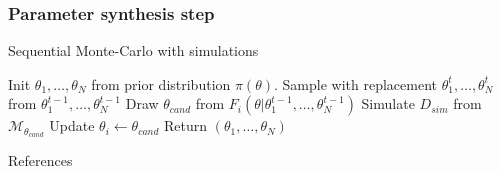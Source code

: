 \documentclass{beamer}
\begin{document}
\begin{frame}
    \frametitle{Parameter synthesis step}
    \begin{algorithm}[H]
        \caption{Sequential Monte-Carlo with simulations}
        \label{smc-abc-smc-alg}
        \begin{algorithmic}[1]
            \State Init $\theta_1,\ldots,\theta_N$ from prior distribution $\pi(\theta)$.
            \State Sample with replacement $\theta^t_1,\ldots,\theta^t_N$ from $\theta^{t-1}_1,\ldots,\theta^{t-1}_N$
            \State Draw $\theta_{cand}$ from $F_i(\theta|\theta^{t-1}_1,\ldots,\theta^{t-1}_N)$
            \State Simulate $D_{sim}$ from $\mathcal{M}_{\theta_{cand}}$
            \State Update $\theta_i \leftarrow \theta_{cand}$
            \EndIf
            \EndIf
            \EndFor
            \EndFor
            \State Return $(\theta_1,\ldots,\theta_N)$
            \EndProcedure
        \end{algorithmic}
    \end{algorithm}
\end{frame}


\begin{frame}[allowframebreaks]{References}
    \printbibliography
\end{frame}
\end{document}
